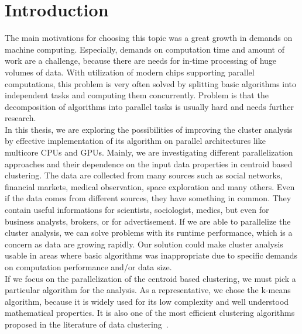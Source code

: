 \pagestyle{plain}
\setcounter{page}{1}

\chapter{Introduction}
The main motivations for choosing this topic was a great growth in demands on machine computing. Especially, demands on computation time and amount of work are a challenge, because there are needs for in-time processing of huge volumes of data. With utilization of modern chips supporting parallel computations, this problem is very often solved by splitting basic algorithms into independent tasks and computing them concurrently. Problem is that the decomposition of algorithms into parallel tasks is usually hard and needs further research.\\

In this thesis, we are exploring the possibilities of improving the cluster analysis by effective implementation of its algorithm on parallel architectures like multicore CPUs and GPUs. Mainly, we are investigating different parallelization approaches and their dependence on the input data properties in centroid based clustering.
The data are collected from many sources such as social networks, financial markets, medical observation, space exploration and many others. Even if the data comes from different sources, they have something in common. They contain useful informations for scientists, sociologist, medics, but even for business analysts, brokers, or for advertisement.
If we are able to parallelize the cluster analysis, we can solve problems with its runtime performance, which is a concern as data are growing rapidly. Our solution could make cluster analysis usable in areas where basic algorithms was inappropriate due to specific demands on computation performance and/or data size.\\


If we focus on the parallelization of the centroid based clustering, we must pick a particular algorithm for the analysis. As a representative, we chose the k-means algorithm, because it is widely used for its low complexity and well understood mathematical properties. It is also one of the most efficient clustering algorithms proposed in the literature of data clustering~\cite{Aggarwal13}.\\

